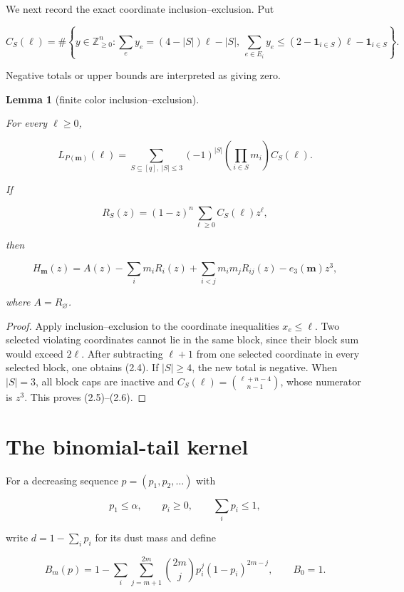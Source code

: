 \documentclass[11pt]{article}
\newtheorem{lemma}[theorem]{Lemma}
\begin{document}
We next record the exact coordinate inclusion--exclusion.  Put

\[
C_S(\ell)=\#\left\{y\in\mathbb Z_{\ge0}^n:
\sum_e y_e=(4-|S|)\ell-|S|,
\ \sum_{e\in E_i}y_e\le(2-\mathbf1_{i\in S})\ell-\mathbf1_{i\in S}
\right\}. \tag{2.4}
\]

Negative totals or upper bounds are interpreted as giving zero.

\Needspace{0.16\textheight}
\begin{lemma}[finite color inclusion--exclusion]
\label{lemma:2-2}

For every $\ell\ge0$,

\[
L_{P(\mathbf m)}(\ell)
=\sum_{S\subseteq[q],\ |S|\le3}
  (-1)^{|S|}\left(\prod_{i\in S}m_i\right)C_S(\ell). \tag{2.5}
\]

If

\[
R_S(z)=(1-z)^n\sum_{\ell\ge0}C_S(\ell)z^\ell,
\]

then

\[
H_{\mathbf m}(z)=A(z)-\sum_i m_iR_i(z)
+\sum_{i<j}m_im_jR_{ij}(z)-e_3(\mathbf m)z^3, \tag{2.6}
\]

where $A=R_\varnothing$.

\end{lemma}

\begin{proof}


Apply inclusion--exclusion to the coordinate inequalities $x_e\le\ell$.
Two selected violating coordinates cannot lie in the same block, since their block
sum would exceed $2\ell$.  After subtracting $\ell+1$ from one selected
coordinate in every selected block, one obtains (2.4).  If $|S|\ge4$, the new
total is negative.  When $|S|=3$, all block caps are inactive and
$C_S(\ell)=\binom{\ell+n-4}{n-1}$, whose numerator is $z^3$.  This proves
(2.5)--(2.6).
\end{proof}


\section{The binomial-tail kernel}


For a decreasing sequence $p=(p_1,p_2,\ldots)$ with

\[
p_1\le\alpha,\qquad p_i\ge0,\qquad \sum_i p_i\le1,
\]

write $d=1-\sum_i p_i$ for its dust mass and define

\[
B_m(p)=1-\sum_i\sum_{j=m+1}^{2m}\binom{2m}{j}p_i^j(1-p_i)^{2m-j},
\qquad B_0=1. \tag{3.1}
\]
\end{document}
